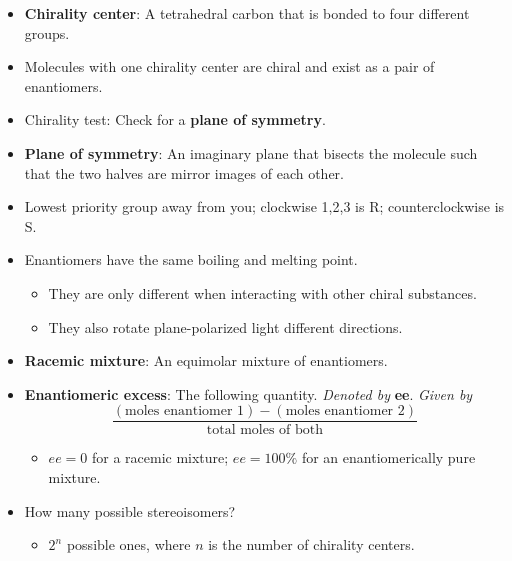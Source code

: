 \documentclass[../notes.tex]{subfiles}
\begin{document}
\begin{itemize}
\begin{itemize}
    \end{itemize}
    \item \textbf{Chirality center}: A tetrahedral carbon that is bonded to four different groups.
    \item Molecules with one chirality center are chiral and exist as a pair of enantiomers.
    \item Chirality test: Check for a \textbf{plane of symmetry}.
    \item \textbf{Plane of symmetry}: An imaginary plane that bisects the molecule such that the two halves are mirror images of each other.
    \item Lowest priority group away from you; clockwise 1,2,3 is R; counterclockwise is S.
    \item Enantiomers have the same boiling and melting point.
    \begin{itemize}
        \item They are only different when interacting with other chiral substances.
        \item They also rotate plane-polarized light different directions.
    \end{itemize}
    \item \textbf{Racemic mixture}: An equimolar mixture of enantiomers.
    \item \textbf{Enantiomeric excess}: The following quantity. \emph{Denoted by} \textbf{ee}. \emph{Given by}
    \begin{equation*}
        \frac{(\text{moles enantiomer 1})-(\text{moles enantiomer 2})}{\text{total moles of both}}
    \end{equation*}
    \begin{itemize}
        \item $ee=0$ for a racemic mixture; $ee=100\%$ for an enantiomerically pure mixture.
    \end{itemize}
    \item How many possible stereoisomers?
    \begin{itemize}
        \item $2^n$ possible ones, where $n$ is the number of chirality centers.
    \end{itemize}
\end{itemize}
\end{document}
